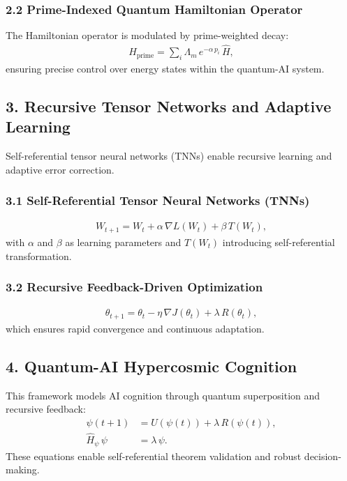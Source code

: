 \documentclass[12pt]{article}
\begin{document}
\subsubsection*{2.2 Prime-Indexed Quantum Hamiltonian Operator}
The Hamiltonian operator is modulated by prime-weighted decay:
\begin{align}
\hat{H}_{\text{prime}} = \sum_{i} \Lambda_m\, e^{-\alpha\, p_i}\, \hat{H},
\end{align}
ensuring precise control over energy states within the quantum-AI system.

\subsection*{3. Recursive Tensor Networks and Adaptive Learning}
Self-referential tensor neural networks (TNNs) enable recursive learning and adaptive error correction.

\subsubsection*{3.1 Self-Referential Tensor Neural Networks (TNNs)}
\begin{align}
W_{t+1} = W_t + \alpha\, \nabla L(W_t) + \beta\, T(W_t),
\end{align}
with $\alpha$ and $\beta$ as learning parameters and $T(W_t)$ introducing self-referential transformation.

\subsubsection*{3.2 Recursive Feedback-Driven Optimization}
\begin{align}
\theta_{t+1} = \theta_t - \eta\, \nabla J(\theta_t) + \lambda\, R(\theta_t),
\end{align}
which ensures rapid convergence and continuous adaptation.

\subsection*{4. Quantum-AI Hypercosmic Cognition}
This framework models AI cognition through quantum superposition and recursive feedback:
\begin{align}
\psi(t+1) &= U(\psi(t)) + \lambda\, R(\psi(t)), \\
\hat{H}_\psi\, \psi &= \lambda\, \psi.
\end{align}
These equations enable self-referential theorem validation and robust decision-making.
\end{document}
